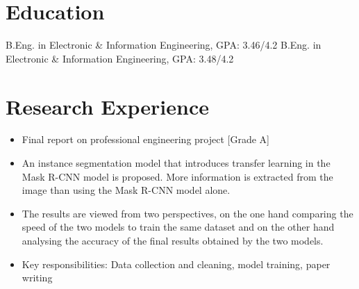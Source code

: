 \documentclass{resume}
\begin{document}



\section{Education}
B.Eng. in Electronic \& Information Engineering, GPA: 3.46/4.2
B.Eng. in Electronic \& Information Engineering, GPA: 3.48/4.2

\section{Research Experience}
\begin{itemize}
  \item Final report on professional engineering project   [Grade A]
  \item An instance segmentation model that introduces transfer learning in the Mask R-CNN model is proposed. More information is extracted from the image than using the Mask R-CNN model alone.
  \item The results are viewed from two perspectives, on the one hand comparing the speed of the two models to train the same dataset and on the other hand analysing the accuracy of the final results obtained by the two models.
  \item Key responsibilities: Data collection and cleaning, model training, paper writing
\end{itemize}
\end{document}
